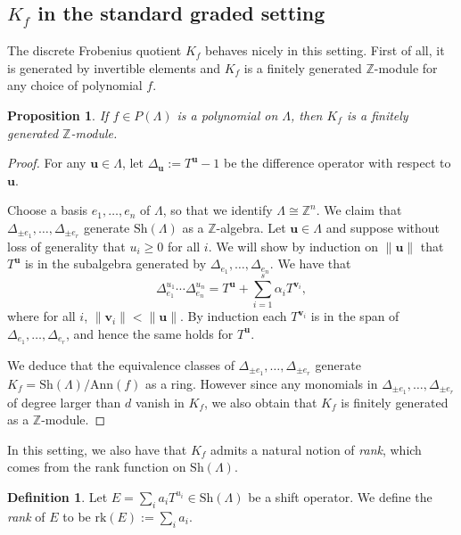 \documentclass[oneside]{amsart}
\theoremstyle{plain}
\newtheorem{proposition}[theorem]{Proposition}
\theoremstyle{definition}
\newtheorem{definition}[theorem]{Definition}
\newcommand{\Z}{{\mathbb{Z}}}
\newcommand{\Ann}{{\mathrm{Ann}}}
\newcommand{\rk}{{\mathrm{rk}}}
\newcommand{\Sh}{{\mathrm{Sh}}}
\renewcommand{\vec}[1]{\ensuremath{\mathbf{#1}}}
\begin{document}
\subsection{\texorpdfstring{$K_f$}{Kf} in the standard graded setting}

The discrete Frobenius quotient $K_f$ behaves nicely in this setting. First of all, it is generated by invertible elements and $K_f$ is a finitely generated $\Z$-module for any choice of polynomial $f$.

\begin{proposition}\label{prop:polyart}
  If $f \in P(\Lambda)$ is a polynomial on $\Lambda$, then $K_f$ is a finitely generated $\Z$-module.
\end{proposition}

\begin{proof}
For any $\mathbf{u} \in \Lambda$, let $\Delta_\mathbf{u} := T^\mathbf{u} - 1$ be the difference operator with respect to $\mathbf{u}$.

Choose a basis $e_1,\ldots, e_n$ of $\Lambda$,
so that we identify $\Lambda \cong \Z^n$.
We claim that $\Delta_{\pm e_1}, \dots, \Delta_{\pm e_r}$ generate
$\Sh(\Lambda)$ as a $\Z$-algebra. Let $\vec u \in \Lambda$ and suppose without loss of generality that $u_i \geq 0$ for all $i$.
We will show by induction on $\|\vec u\|$ that $T^{\vec u}$ is in the subalgebra generated by
$\Delta_{e_1}, \dots, \Delta_{e_n}$. We have that 
$$\Delta_{e_1}^{u_1} \cdots \Delta_{e_n}^{u_n} = T^{\vec u} + \sum_{i = 1}^s \alpha_i T^{\vec v_i},$$
where for all $i$, $\|\vec v_i\| < \|\vec u\|$. By induction each $T^{\vec v_i}$ is in the span of $\Delta_{e_1}, \dots, \Delta_{e_r}$, and hence the same holds for $T^{\vec u}$.

We deduce that the equivalence classes of $\Delta_{\pm e_1}, \dots, \Delta_{\pm e_r}$ generate $K_f = \Sh(\Lambda)/\Ann(f)$ as a ring.
However since any monomials in $\Delta_{\pm e_1}, \dots, \Delta_{\pm e_r}$
of degree larger than $d$
vanish in $K_f$, we also obtain that $K_f$ is finitely generated as a $\Z$-module.
\end{proof}

In this setting, we also have that $K_f$ admits a natural notion of \emph{rank}, which comes from the rank function on $\Sh(\Lambda)$.

\begin{definition}    
Let $E = \sum_{i} a_iT^{u_i} \in \Sh(\Lambda)$ be a shift operator.
We define the \emph{rank} of $E$ to be $\rk(E) := \sum_{i} a_i$.
\end{definition}
\end{document}
